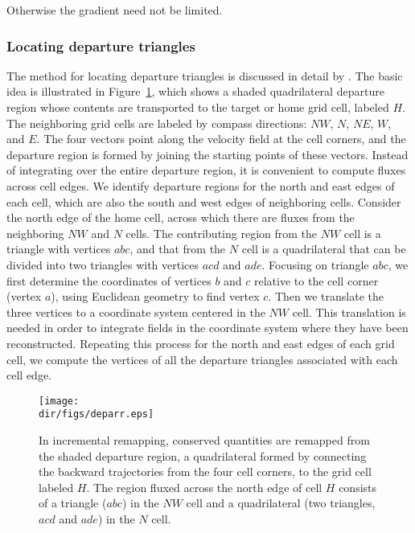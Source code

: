\noindent
Otherwise the gradient need not be limited.

\subsubsection{Locating departure triangles}
\label{sc:glissade-IR-departure} 
The method for locating departure triangles is discussed in detail by 
\citet{Dukowicz2000}. The basic idea is illustrated in Figure~\ref{fig:gliss.deparr}, 
which shows a shaded quadrilateral departure region whose contents are transported to
the target or home grid cell, labeled $H$. The neighboring grid
cells are labeled by compass directions: $NW$, $N$, $NE$, $W$, and
$E$.  The four vectors point along the velocity field at the cell
corners, and the departure region is formed by joining the
starting points of these vectors.  Instead of integrating over the
entire departure region, it is convenient to compute fluxes across
cell edges.  We identify departure regions for the north and east
edges of each cell, which are also the south and west edges of
neighboring cells. Consider the north edge of the home cell,
across which there are fluxes from the neighboring $NW$ and $N$
cells. The contributing region from the $NW$ cell is a triangle
with vertices $abc$, and that from the $N$ cell is a quadrilateral
that can be divided into two triangles with vertices $acd$ and
$ade$. Focusing on triangle $abc$, we first determine the
coordinates of vertices $b$ and $c$ relative to the cell corner
(vertex $a$), using Euclidean geometry to find vertex $c$. Then we
translate the three vertices to a coordinate system centered in
the $NW$ cell.  This translation is needed in order to integrate
fields in the coordinate system where they have been reconstructed.
Repeating this process for
the north and east edges of each grid cell, we compute the
vertices of all the departure triangles associated with each cell
edge.

\begin{figure}[htbp]
  \begin{center}
    \texttt{[image: \\dir/figs/deparr.eps]}
  \end{center}
  \caption{In incremental remapping, conserved
    quantities are remapped from the shaded departure region, a
    quadrilateral formed by connecting the backward trajectories
    from the four cell corners, to the grid cell labeled $H$.
    The region fluxed across the north edge of cell $H$ consists
    of a triangle ($abc$) in the $NW$ cell and a quadrilateral 
    (two triangles, $acd$ and $ade$) in the $N$ cell.}
  \label{fig:gliss.deparr}
\end{figure}

